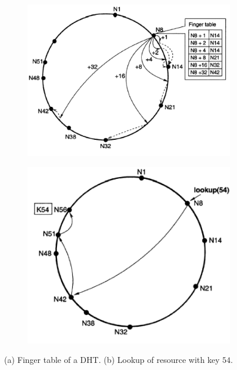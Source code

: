 \begin{figure}[h!]
        \centering
        \begin{subfigure}{.5\textwidth}
          \centering
          \includegraphics[width=\linewidth]{assets/images/dht1.png}
          \caption{}
          \label{fig:sub1}
        \end{subfigure}%
        \begin{subfigure}{.5\textwidth}
          \centering
          \includegraphics[width=\linewidth]{assets/images/dht2.png}
          \caption{}
          \label{fig:sub2}
        \end{subfigure}
        \caption{(a) Finger table of a DHT. (b) Lookup of resource with key $54$. \cite{dht_image}}
        \label{fig:dht}
    \end{figure}


